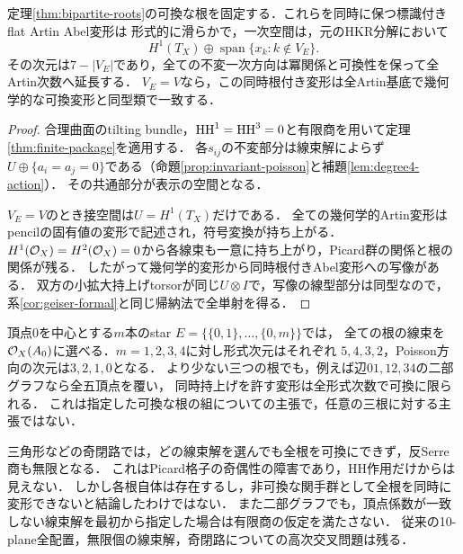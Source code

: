 \begin{corollary}[二部グラフの根の同時形式変形]\label{cor:graph-formal}
定理\ref{thm:bipartite-roots}の可換な根を固定する．これらを同時に保つ標識付きflat Artin Abel変形は
形式的に滑らかで，一次空間は，元のHKR分解において
\[
 H^1(T_X)\oplus\operatorname{span}\{x_k:k\notin V_E\}.
\]
その次元は$7-|V_E|$であり，全ての不変一次方向は冪関係と可換性を保って全Artin次数へ延長する．
$V_E=V$なら，この同時根付き変形は全Artin基底で幾何学的な可換変形と同型類で一致する．
\end{corollary}
\begin{proof}
合理曲面のtilting bundle，$\operatorname{HH}^1=\operatorname{HH}^3=0$と有限商を用いて定理\ref{thm:finite-package}を適用する．
各$s_{ij}$の不変部分は線束解によらず
$U\oplus\{a_i=a_j=0\}$である（命題\ref{prop:invariant-poisson}と補題\ref{lem:degree4-action}）．
その共通部分が表示の空間となる．

$V_E=V$のとき接空間は$U=H^1(T_X)$だけである．
全ての幾何学的Artin変形はpencilの固有値の変形で記述され，符号変換が持ち上がる．
$H^1(\mathcal O_X)=H^2(\mathcal O_X)=0$から各線束も一意に持ち上がり，Picard群の関係と根の関係が残る．
したがって幾何学的変形から同時根付きAbel変形への写像がある．
双方の小拡大持上げtorsorが同じ$U\otimes I$で，写像の線型部分は同型なので，
系\ref{cor:geiser-formal}と同じ帰納法で全単射を得る．
\end{proof}

\begin{example}[根の数ではなく被覆頂点数が効く]\label{ex:root-star}
頂点0を中心とする$m$本のstar $E=\{\{0,1\},\ldots,\{0,m\}\}$では，
全ての根の線束を$\mathcal O_X(A_0)$に選べる．$m=1,2,3,4$に対し形式次元はそれぞれ
$5,4,3,2$，Poisson方向の次元は$3,2,1,0$となる．
より少ない三つの根でも，例えば辺$01,12,34$の二部グラフなら全五頂点を覆い，
同時持上げを許す変形は全形式次数で可換に限られる．
これは指定した可換な根の組についての主張で，任意の三根に対する主張ではない．
\end{example}

\begin{remark}\label{rem:odd-cycle}
三角形などの奇閉路では，どの線束解を選んでも全根を可換にできず，反Serre商も無限となる．
これはPicard格子の奇偶性の障害であり，HH作用だけからは見えない．
しかし各根自体は存在するし，非可換な関手群として全根を同時に変形できないと結論したわけではない．
また二部グラフでも，頂点係数が一致しない線束解を最初から指定した場合は有限商の仮定を満たさない．
従来の10-plane全配置，無限個の線束解，奇閉路についての高次交叉問題は残る．
\end{remark}


